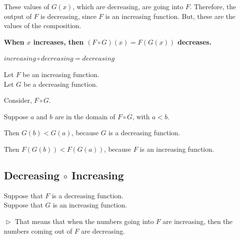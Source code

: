 \documentclass{ximera}
\begin{document}
These values of $G(x)$, which are decreasing, are going into $F$.  Therefore, the output of $F$ is decreasing, since $F$ is an increasing function.  But, these are the values of the composition.


\begin{center}
\textbf{\textcolor{red!70!black}{When $x$ increases, then $(F \circ G)(x) = F(G(x))$ decreases.}}
\end{center}



\begin{fact}
$increasing \circ decreasing = decreasing$


Let $F$ be an increasing function. \\
Let $G$ be a decreasing function. 


Consider, $F \circ G$.

Suppose $a$ and $b$ are in the domain of $F \circ G$, with $a < b$. 

Then $G(b) < G(a)$, because $G$ is a decreasing function. 

Then $F(G(b)) < F(G(a))$, because $F$ is an increasing function.


\end{fact}





































\subsection*{Decreasing $\circ$ Increasing}


Suppose that $F$ is a decreasing function. \\
Suppose that $G$ is an increasing function. 


$\vartriangleright$ That means that when the numbers going into $F$ are increasing, then the numbers coming out of $F$ are decreasing. 
\end{document}

